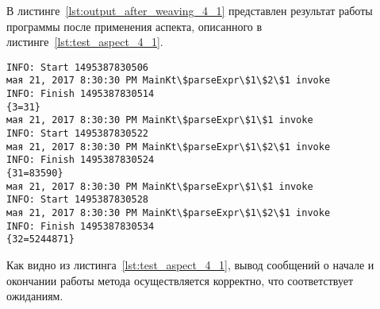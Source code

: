 В листинге~\ref{lst:output_after_weaving_4_1} представлен результат работы программы после применения аспекта, описанного в листинге~\ref{lst:test_aspect_4_1}. 
\begin{lstlisting}[style={java}, label={lst:output_after_weaving_4_1},
 caption={Результат работы программы после применения аспекта, описанного в листинге~\ref{lst:test_aspect_4_1}}]
INFO: Start 1495387830506
мая 21, 2017 8:30:30 PM MainKt\$parseExpr\$1\$2\$1 invoke
INFO: Finish 1495387830514
{3=31}
мая 21, 2017 8:30:30 PM MainKt\$parseExpr\$1\$1 invoke
INFO: Start 1495387830522
мая 21, 2017 8:30:30 PM MainKt\$parseExpr\$1\$2\$1 invoke
INFO: Finish 1495387830524
{31=83590}
мая 21, 2017 8:30:30 PM MainKt\$parseExpr\$1\$1 invoke
INFO: Start 1495387830528
мая 21, 2017 8:30:30 PM MainKt\$parseExpr\$1\$2\$1 invoke
INFO: Finish 1495387830534
{32=5244871}
\end{lstlisting}
Как видно из листинга~\ref{lst:test_aspect_4_1}, вывод сообщений о начале и окончании работы метода осуществляется корректно, что соответствует ожиданиям.




